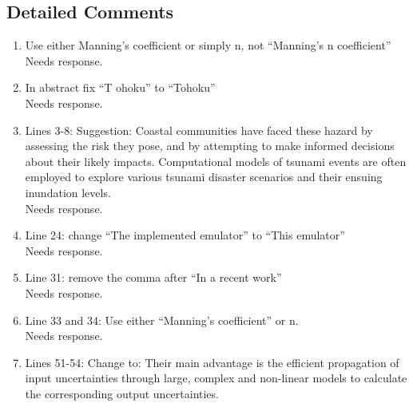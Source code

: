 \documentclass[]{article}
\newcommand{\alert}[1]{{\color{red} #1}}
\begin{document}
\subsection*{Detailed Comments}
\begin{enumerate}
\item Use either Manning’s coefficient or simply n, not “Manning’s n coefficient” \\

\alert{Needs response.} \\

\item In abstract fix “T ohoku” to “Tohoku” \\

\alert{Needs response.} \\

\item Lines 3-8: Suggestion: Coastal communities have faced these hazard by assessing the risk they pose, and by attempting to make informed decisions about their likely impacts. Computational models of tsunami events are often employed to explore various tsunami disaster scenarios and their ensuing inundation levels. \\

\alert{Needs response.} \\

\item Line 24: change “The implemented emulator” to “This emulator” \\

\alert{Needs response.} \\

\item Line 31: remove the comma after “In a recent work” \\

\alert{Needs response.} \\

\item Line 33 and 34: Use either “Manning’s coefficient” or n. \\

\alert{Needs response.} \\

\item Lines 51-54: Change to: Their main advantage is the efficient propagation of input uncertainties through large, complex and non-linear models to calculate the corresponding output uncertainties. \\


\end{enumerate}
\end{document}
